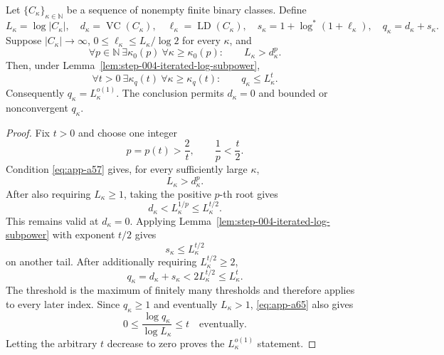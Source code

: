 \begin{proposition}
\label{prop:step-004-q-subpower}
Let \(\{C_\kappa\}_{\kappa\in\mathbb N}\) be a sequence of nonempty
finite binary classes.  Define
\[
L_\kappa=\log|C_\kappa|,\quad
d_\kappa=\operatorname{VC}(C_\kappa),\quad
\ell_\kappa=\operatorname{LD}(C_\kappa),\quad
s_\kappa=1+\log^*(1+\ell_\kappa),\quad
q_\kappa=d_\kappa+s_\kappa.
\]
Suppose \(|C_\kappa|\to\infty\),
\(0\leq\ell_\kappa\leq L_\kappa/\log2\) for every \(\kappa\), and
\[
\forall p\in\mathbb N\ \exists\kappa_0(p)\
\forall\kappa\geq\kappa_0(p):
\qquad L_\kappa>d_\kappa^p.
\]
Then, under Lemma~\ref{lem:step-004-iterated-log-subpower},
\begin{equation}
\forall t>0\ \exists\kappa_q(t)\
\forall\kappa\geq\kappa_q(t):
\qquad q_\kappa\leq L_\kappa^t.
\label{eq:app-a65}
\end{equation}
Consequently \(q_\kappa=L_\kappa^{o(1)}\).  The conclusion permits
\(d_\kappa=0\) and bounded or nonconvergent \(q_\kappa\).
\end{proposition}

\begin{proof}
Fix \(t>0\) and choose one integer
\begin{equation}
p=p(t)>\frac2t,\qquad \frac1p<\frac t2.
\label{eq:app-a66}
\end{equation}
Condition \eqref{eq:app-a57} gives, for every sufficiently large \(\kappa\),
\begin{equation}
L_\kappa>d_\kappa^p.
\label{eq:app-a67}
\end{equation}
After also requiring \(L_\kappa\geq1\), taking the positive
\(p\)-th root gives
\begin{equation}
d_\kappa<L_\kappa^{1/p}
\leq L_\kappa^{t/2}.
\label{eq:app-a68}
\end{equation}
This remains valid at \(d_\kappa=0\).  Applying
Lemma~\ref{lem:step-004-iterated-log-subpower} with exponent \(t/2\)
gives
\begin{equation}
s_\kappa\leq L_\kappa^{t/2}
\label{eq:app-a69}
\end{equation}
on another tail.  After additionally requiring
\(L_\kappa^{t/2}\geq2\),
\begin{equation}
q_\kappa=d_\kappa+s_\kappa
<2L_\kappa^{t/2}
\leq L_\kappa^t.
\label{eq:app-a70}
\end{equation}
The threshold is the maximum of finitely many thresholds and
therefore applies to every later index.  Since \(q_\kappa\geq1\) and
eventually \(L_\kappa>1\), \eqref{eq:app-a65} also gives
\begin{equation}
0\leq
\frac{\log q_\kappa}{\log L_\kappa}
\leq t
\quad\text{eventually}.
\label{eq:app-a71}
\end{equation}
Letting the arbitrary \(t\) decrease to zero proves the
\(L_\kappa^{o(1)}\) statement.
\end{proof}

